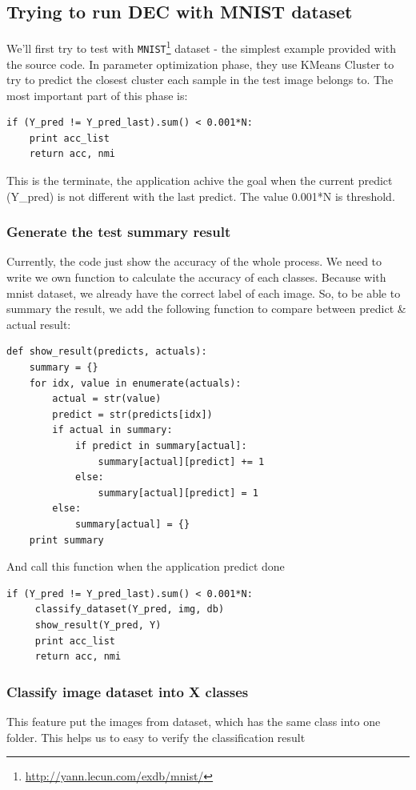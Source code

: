 \documentclass[hidelinks,12pt,a4paper]{report}
\begin{document}
\subsection{Trying to run DEC with MNIST dataset}
We'll first try to test with \texttt{MNIST}\footnote{\url{http://yann.lecun.com/exdb/mnist/}} dataset - the simplest example provided with the source code.\newline
In parameter optimization phase, they use KMeans Cluster to try to predict the closest cluster each sample in the test image belongs to. The most important part of this phase is:
\begin{lstlisting}
if (Y_pred != Y_pred_last).sum() < 0.001*N:
    print acc_list
    return acc, nmi
\end{lstlisting}
This is the terminate, the application achive the goal when the current predict (Y\_pred) is not different with the last predict. The value 0.001*N is threshold.
\subsubsection{Generate the test summary result}
Currently, the code just show the accuracy of the whole process. We need to write we own function to calculate the accuracy of each classes.
Because with mnist dataset, we already have the correct label of each image. So, to be able to summary the result, we add the following function to compare between predict \& actual result:

\begin{lstlisting}
def show_result(predicts, actuals):
    summary = {}
    for idx, value in enumerate(actuals):
        actual = str(value)
        predict = str(predicts[idx])
        if actual in summary:
            if predict in summary[actual]:
                summary[actual][predict] += 1
            else:
                summary[actual][predict] = 1
        else:
            summary[actual] = {}
    print summary
\end{lstlisting}
And call this function when the application predict done
\begin{lstlisting}
if (Y_pred != Y_pred_last).sum() < 0.001*N:
     classify_dataset(Y_pred, img, db)
     show_result(Y_pred, Y)
     print acc_list
     return acc, nmi
\end{lstlisting}

\subsubsection{Classify image dataset into X classes}
This feature put the images from dataset, which has the same class into one folder. This helps us to easy to verify the classification result
\end{document}
